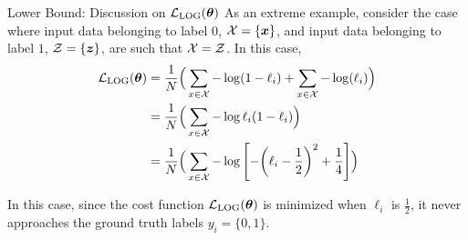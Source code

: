 \documentclass[dvipdfmx,10pt,aspectratio=169]{beamer}
\begin{document}
\begin{frame}{Lower Bound: Discussion on $\mathcal{L}_{\mathrm{LOG}}(\vb*{\theta})$}
    As an extreme example, consider the case where input data belonging to label $0$, $\mathcal{X} = \{\vb*{x}\}$, and input data belonging to label $1$, $\mathcal{Z} = \{\vb*{z}\}$, are such that $\mathcal{X} = \mathcal{Z}$.
    In this case,
    \begin{align*}
        \mathcal{L}_{\mathrm{LOG}}(\vb*{\theta})
        &= \frac1N\Big(\sum_{x\in\mathcal{X}} -\log(1-\ell_i) + \sum_{x\in\mathcal{X}} -\log(\ell_i)\Big)\\
        &= \frac1N\Big(\sum_{x\in\mathcal{X}} - \log\ell_i(1-\ell_i)\Big)\\
        &= \frac1N\Big(\sum_{x\in\mathcal{X}} - \log\qty[-\qty(\ell_i - \frac12)^2 + \frac14]\Big)
    \end{align*}
    
    In this case, since the cost function $\mathcal{L}_{\mathrm{LOG}}(\vb*{\theta})$ is minimized when $\ell_i$ is $\frac12$, it never approaches the ground truth labels $y_i = \{0,1\}$.
\end{frame}
\end{document}
